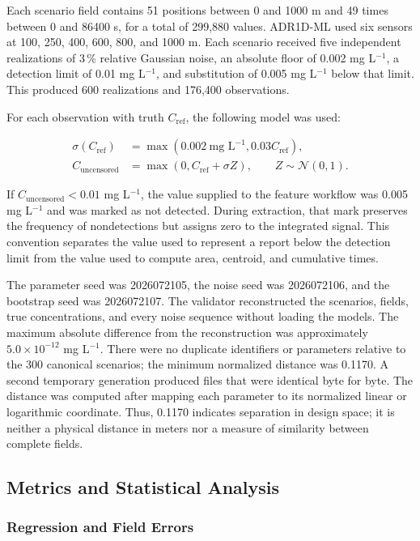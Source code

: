 \documentclass[11pt,a4paper]{article}
\begin{document}
Each scenario field contains 51 positions between 0 and 1000 m and 49 times
between 0 and 86400 s, for a total of 299,880 values. ADR1D-ML used six sensors
at 100, 250, 400, 600, 800, and 1000 m. Each scenario received five independent
realizations of 3\,\% relative Gaussian noise, an absolute floor of
0.002 mg L$^{-1}$, a detection limit of 0.01 mg L$^{-1}$, and substitution of
0.005 mg L$^{-1}$ below that limit. This produced 600 realizations and 176,400
observations.

For each observation with truth $C_{\mathrm{ref}}$, the following model was
used:

\begin{align}
\sigma(C_{\mathrm{ref}})&=\max\!\left(0.002\ \text{mg L}^{-1},
0.03C_{\mathrm{ref}}\right),\\
C_{\mathrm{uncensored}}&=\max\!\left(0,
C_{\mathrm{ref}}+\sigma Z\right),\qquad Z\sim\mathcal N(0,1).
\label{eq:sensor-noise}
\end{align}

If $C_{\mathrm{uncensored}}<0.01$ mg L$^{-1}$, the value supplied to the
feature workflow was 0.005 mg L$^{-1}$ and was marked as not detected. During
extraction, that mark preserves the frequency of nondetections but assigns zero
to the integrated signal. This convention separates the value used to
represent a report below the detection limit from the value used to compute
area, centroid, and cumulative times.

The parameter seed was 2026072105, the noise seed was 2026072106, and the
bootstrap seed was 2026072107. The validator reconstructed the scenarios,
fields, true concentrations, and every noise sequence without loading the
models. The maximum absolute difference from the reconstruction was
approximately $5.0\times10^{-12}$ mg L$^{-1}$. There were no duplicate
identifiers or parameters relative to the 300 canonical scenarios; the minimum
normalized distance was 0.1170. A second temporary generation produced files
that were identical byte for byte. The distance was computed after mapping
each parameter to its normalized linear or logarithmic coordinate. Thus,
0.1170 indicates separation in design space; it is neither a physical distance
in meters nor a measure of similarity between complete fields.

\subsection{Metrics and Statistical Analysis}

\subsubsection{Regression and Field Errors}
\end{document}
